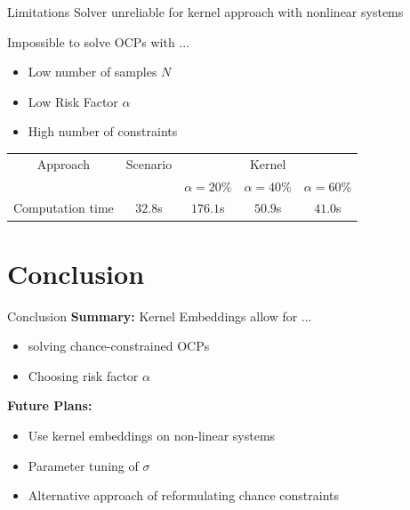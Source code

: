 \documentclass[student, noshadow, itr, english, aspectratio=169]{ITR_LSR_slides}
\begin{document}
\begin{frame}{Limitations}
	Solver unreliable for kernel approach with nonlinear systems

	Impossible to solve OCPs with ...
	\begin{itemize}
	\item Low number of samples $N$
	\item Low Risk Factor $\alpha$
	\item High number of constraints
	\end{itemize}

\begin{table}
\centering
\begin{tabular}{|c| c| c| c| c|}
\hline
Approach & Scenario &  \multicolumn{3}{|c|}{Kernel}\\  \cline{3-5} & &  $\alpha = 20$\% & $\alpha = 40$\% & $\alpha = 60$\% \\
\hline
Computation time & $32.8$s & $176.1$s & $50.9$s & $41.0$s\\
\hline
\end{tabular}
\label{tab:computation times}
\end{table} 
\end{frame}

\section{Conclusion}

\begin{frame}{Conclusion}
	\textbf{Summary:}
	Kernel Embeddings allow for ...
	\begin{itemize}
		\item solving chance-constrained OCPs
		\item Choosing risk factor $\alpha$
	\end{itemize}
	\vspace{.5cm}
	
	\textbf{Future Plans:}
	\begin{itemize}
		\item Use kernel embeddings on non-linear systems
		\item Parameter tuning of $\sigma$
		\item Alternative approach of reformulating chance constraints
	\end{itemize}
\end{frame}
\end{document}
